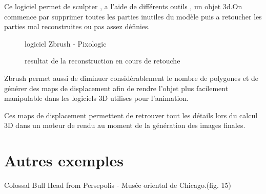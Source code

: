 \documentclass[a4paper,10pt,french]{sphinxhowto}
\begin{document}
Ce logiciel permet de sculpter , a l'aide de différents outils , un objet 3d.On commence par supprimer toutes les parties inutiles du modèle puis a retoucher les parties mal reconstruites ou pas assez définies.
\begin{figure}[htbp]
\centering
\capstart

\caption{resultat de la reconstruction en cours de retouche}{\small 
logiciel Zbrush - Pixologic
}\end{figure}

Zbrush permet aussi de diminuer considérablement le nombre de polygones et de générer des maps de displacement afin de rendre l'objet plus facilement manipulable dans les logiciels 3D utilises pour l'animation.

Ces maps de displacement permettent de retrouver tout les détails lors du calcul 3D dans un moteur de rendu au moment de la génération des images finales.


\section{Autres exemples}
\label{autres:autres-exemples}\label{autres::doc}
Colossal Bull Head from Persepolis - Musée oriental de Chicago.(fig. 15)
\end{document}
